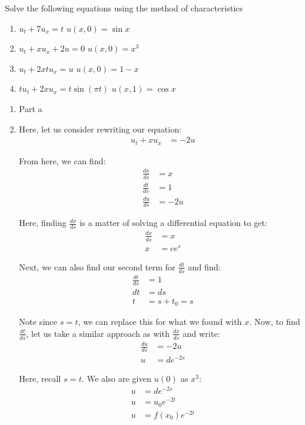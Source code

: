 \item Solve the following equations using the method of characteristics
\begin{enumerate}
  \item $u_t + 7u_x = t$ \quad $u(x, 0) = \sin x$
  \item $u_t + xu_x + 2u = 0$ \quad $u(x, 0) = x^3$
  \item $u_t + 2xtu_x = u$ \quad $u(x, 0) = 1 - x$
  \item $tu_t + 2xu_x = t\sin(\pi t)$ \quad $u(x, 1) = \cos x$
\end{enumerate}
\bigbreak

\begin{enumerate}
  \item Part a
  \item Here, let us consider rewriting our equation:
  \begin{align}
    u_t + xu_x & = -2u
  \end{align}

  From here, we can find:
  \begin{align}
    \frac{dx}{ds} & = x\\
    \frac{dt}{ds} & = 1\\
    \frac{du}{ds} & = -2u
  \end{align}

  Here, finding $\frac{dx}{ds}$ is a matter of solving a differential equation to get:
  \begin{align}
    \frac{dx}{ds} & = x\\
    x & = ce^s
  \end{align}

  Next, we can also find our second term for $\frac{dt}{ds}$ and find:
  \begin{align}
    \frac{dt}{ds} & = 1\\
    dt & = ds\\
    t & = s + t_0 = s
  \end{align}

  Note since $s = t$, we can replace this for what we found with $x$.
  Now, to find
  $\frac{dt}{ds}$,
  let us take a similar approach as with
  $\frac{dx}{ds}$ and write:
  \begin{align}
    \frac{du}{ds} & = -2u\\
    u & = de^{-2s}
  \end{align}

  Here, recall $s = t$. We also are given $u(0)$ as $x^3$:
  \begin{align}
    u & = de^{-2s}\\
    u & = u_0 e^{-2t}\\
    u & = f\left( x_0 \right) e^{-2t}
  \end{align}


\end{enumerate}
